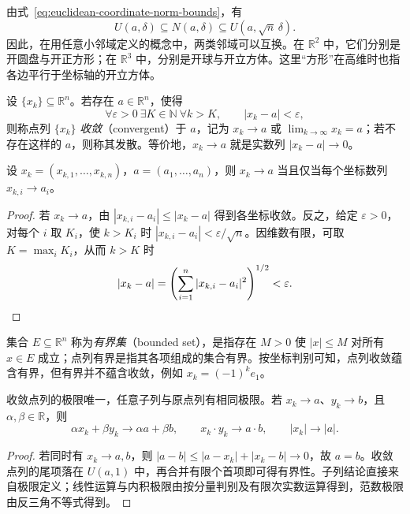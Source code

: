 由式~\eqref{eq:euclidean-coordinate-norm-bounds}，有
\begin{equation}
    U(a,\delta)\subseteq N(a,\delta)\subseteq U(a,\sqrt n\,\delta).
    \label{eq:ball-cube-neighborhood-inclusions}
\end{equation}
因此，在用任意小邻域定义的概念中，两类邻域可以互换。在 $\mathbb R^2$ 中，它们分别是开圆盘与开正方形；在 $\mathbb R^3$ 中，分别是开球与开立方体。这里“方形”在高维时也指各边平行于坐标轴的开立方体。

\begin{definition}
\label{def:convergent-euclidean-sequence}
设 $\{x_k\}\subseteq\mathbb R^n$。若存在 $a\in\mathbb R^n$，使得
\[
    \forall\varepsilon>0\ \exists K\in\mathbb N\ \forall k>K,
    \qquad |x_k-a|<\varepsilon,
\]
则称点列 $\{x_k\}$ \emph{收敛}（convergent）于 $a$，记为 $x_k\to a$ 或 $\lim_{k\to\infty}x_k=a$；若不存在这样的 $a$，则称其发散。等价地，$x_k\to a$ 就是实数列 $|x_k-a|\to0$。
\end{definition}

\begin{theorem}[按分量判定收敛]
\label{thm:euclidean-sequence-componentwise-convergence}
设 $x_k=(x_{k,1},\ldots,x_{k,n})$，$a=(a_1,\ldots,a_n)$，则 $x_k\to a$ 当且仅当每个坐标数列 $x_{k,i}\to a_i$。
\end{theorem}

\begin{proof}
若 $x_k\to a$，由 $|x_{k,i}-a_i|\leq|x_k-a|$ 得到各坐标收敛。反之，给定 $\varepsilon>0$，对每个 $i$ 取 $K_i$，使 $k>K_i$ 时 $|x_{k,i}-a_i|<\varepsilon/\sqrt n$。因维数有限，可取 $K=\max_i K_i$，从而 $k>K$ 时
\[
    |x_k-a|=\left(\sum_{i=1}^n|x_{k,i}-a_i|^2\right)^{1/2}<\varepsilon.
    \qedhere
\]
\end{proof}

集合 $E\subseteq\mathbb R^n$ 称为\emph{有界集}（bounded set），是指存在 $M>0$ 使 $|x|\leq M$ 对所有 $x\in E$ 成立；点列有界是指其各项组成的集合有界。按坐标判别可知，点列收敛蕴含有界，但有界并不蕴含收敛，例如 $x_k=(-1)^k e_1$。

\begin{proposition}
\label{prop:euclidean-sequence-limit-rules}
收敛点列的极限唯一，任意子列与原点列有相同极限。若 $x_k\to a$、$y_k\to b$，且 $\alpha,\beta\in\mathbb R$，则
\[
    \alpha x_k+\beta y_k\to\alpha a+\beta b,\qquad
    x_k\cdot y_k\to a\cdot b,\qquad |x_k|\to|a|.
\]
\end{proposition}

\begin{proof}
若同时有 $x_k\to a,b$，则 $|a-b|\leq|a-x_k|+|x_k-b|\to0$，故 $a=b$。收敛点列的尾项落在 $U(a,1)$ 中，再合并有限个首项即可得有界性。子列结论直接来自极限定义；线性运算与内积极限由按分量判别及有限次实数运算得到，范数极限由反三角不等式得到。
\end{proof}

